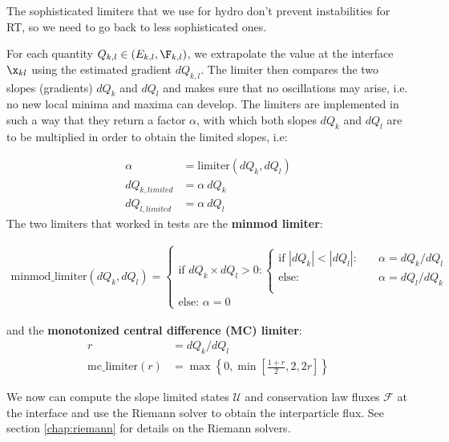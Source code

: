 
The sophisticated limiters that we use for hydro don't prevent instabilities for
RT, so we need to go back to less sophisticated ones.


For each quantity $Q_{k,l} \in (E_{k,l}, \F_{k,l})$, we extrapolate the value at the interface
$\x_{kl}$ using the estimated gradient $dQ_{k,l}$. The limiter then compares the two slopes
(gradients) $dQ_k$ and $dQ_l$ and makes sure that no oscillations may arise, i.e. no new local
minima and maxima can develop. The limiters are implemented in such a way that they return a factor
$\alpha$, with which both slopes $dQ_k$ and $dQ_l$ are to be multiplied in order to obtain the
limited slopes, i.e:

\begin{align}
	\alpha &= \text{limiter}(dQ_k, dQ_l)\\
	dQ_{k, limited} &= \alpha\ dQ_k\\
	dQ_{l, limited} &= \alpha\ dQ_l
\end{align}
The two limiters that worked in tests are the \textbf{minmod limiter}:

\begin{align}
	\text{minmod\_limiter}(dQ_k, dQ_l) =
		\begin{cases}
		\text{if } dQ_k \times dQ_l > 0:
			\begin{cases}
				\text{if } |dQ_k| < |dQ_l| :\quad &\alpha = dQ_k / dQ_l \\
				\text{else: } &\alpha = dQ_l / dQ_k\\
			\end{cases}\\
			\text{else: } \alpha = 0
		\end{cases}
\end{align}

and the \textbf{monotonized central difference (MC) limiter}:
\begin{align}
	r &= dQ_k / dQ_l \\
	\text{mc\_limiter}(r) &= \max \left\{ 0, \min\left[\frac{1 + r}{2}, 2, 2r \right] \right\}
\end{align}

We now can compute the slope limited states $\mathcal{U}$ and conservation law fluxes $\mathcal{F}$
at the interface and use the Riemann solver to obtain the interparticle flux.
See section \ref{chap:riemann} for details on the Riemann solvers.

